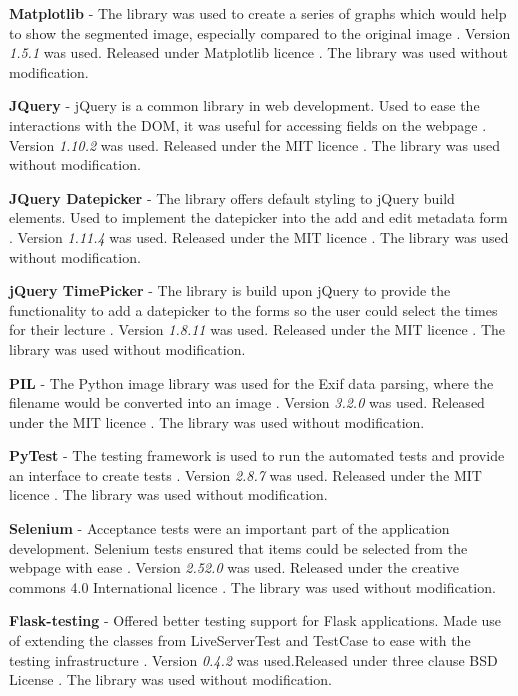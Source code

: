 \textbf{Matplotlib} - The library was used to create a series of graphs which would help to show the segmented image, especially compared to the original image \cite{Hunter:2007}. Version \textit{1.5.1} was used. Released under Matplotlib licence \cite{citeulike:14025887}. The library was used without modification.

\textbf{JQuery} - jQuery is a common library in web development. Used to ease the interactions with the DOM, it was useful for accessing fields on the webpage \cite{citeulike:14025897}. Version \textit{1.10.2} was used. Released under the MIT licence \cite{citeulike:14025880}. The library was used without modification.

\textbf{JQuery Datepicker} - The library offers default styling to jQuery build elements. Used to implement the datepicker into the add and edit metadata form \cite{citeulike:14025900}. Version \textit{1.11.4} was used. Released under the MIT licence \cite{citeulike:14025880}. The library was used without modification.

\textbf{jQuery TimePicker} - The library is build upon jQuery to provide the functionality to add a datepicker to the forms so the user could select the times for their lecture \cite{citeulike:14004013}. Version \textit{1.8.11} was used. Released under the MIT licence \cite{citeulike:14025880}. The library was used without modification.

\textbf{PIL} - The Python image library was used for the Exif data parsing, where the filename would be converted into an image \cite{citeulike:14024992}. Version \textit{3.2.0} was used. Released under the MIT licence \cite{citeulike:14025880}. The library was used without modification.

\textbf{PyTest} - The testing framework is used to run the automated tests and provide an interface to create tests \cite{citeulike:1402058}. Version \textit{2.8.7} was used. Released under the MIT licence \cite{citeulike:14025880}. The library was used without modification.

\textbf{Selenium} - Acceptance tests were an important part of the application development. Selenium tests ensured that items could be selected from the webpage with ease \cite{citeulike:14020625}. Version \textit{2.52.0} was used. Released under the creative commons 4.0 International licence \cite{citeulike:14025914}. The library was used without modification.

\textbf{Flask-testing} - Offered better testing support for Flask applications. Made use of extending the classes from LiveServerTest and TestCase to ease with the testing infrastructure \cite{citeulike:14020588}. Version \textit{0.4.2} was used.Released under three clause BSD License \cite{citeulike:14025861}. The library was used without modification.

